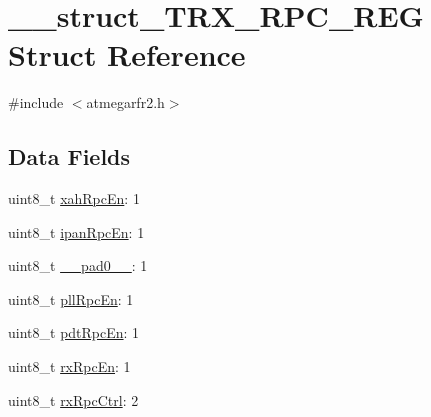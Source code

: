 \hypertarget{struct____struct___t_r_x___r_p_c___r_e_g}{\section{\-\_\-\-\_\-struct\-\_\-\-T\-R\-X\-\_\-\-R\-P\-C\-\_\-\-R\-E\-G Struct Reference}
\label{struct____struct___t_r_x___r_p_c___r_e_g}
}


{\ttfamily \#include $<$atmegarfr2.\-h$>$}

\subsection*{Data Fields}
\begin{DoxyCompactItemize}
\item 
uint8\-\_\-t \hyperlink{struct____struct___t_r_x___r_p_c___r_e_g_a0595720eda3e7f94162270dc7e48be5d}{xah\-Rpc\-En}\-: 1
\item 
uint8\-\_\-t \hyperlink{struct____struct___t_r_x___r_p_c___r_e_g_a043e9457e517048e12140c5ee75edd17}{ipan\-Rpc\-En}\-: 1
\item 
uint8\-\_\-t \hyperlink{struct____struct___t_r_x___r_p_c___r_e_g_accf51ea46e0c257bec2b564faba7c8dc}{\-\_\-\-\_\-pad0\-\_\-\-\_\-}\-: 1
\item 
uint8\-\_\-t \hyperlink{struct____struct___t_r_x___r_p_c___r_e_g_ad954d4f82c1d5e5e465ad4286a4e1152}{pll\-Rpc\-En}\-: 1
\item 
uint8\-\_\-t \hyperlink{struct____struct___t_r_x___r_p_c___r_e_g_aedd3c25ce8857b1683f033de39245da8}{pdt\-Rpc\-En}\-: 1
\item 
uint8\-\_\-t \hyperlink{struct____struct___t_r_x___r_p_c___r_e_g_a5c9717d039a5e0c9f5735f5e4a7148ad}{rx\-Rpc\-En}\-: 1
\item 
uint8\-\_\-t \hyperlink{struct____struct___t_r_x___r_p_c___r_e_g_a918c87c88d3d35aea73de79b6273f4ff}{rx\-Rpc\-Ctrl}\-: 2
\end{DoxyCompactItemize}


